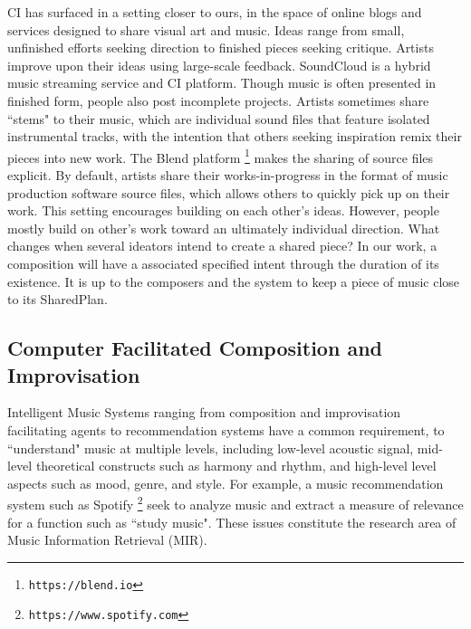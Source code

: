 \documentclass[final,authoryear,5p,times,twocolumn]{elsarticle}
\begin{document}
CI has surfaced in a setting closer to ours, in the space of online blogs and services designed to share visual art and music. Ideas range from small, unfinished efforts seeking direction to finished pieces seeking critique. Artists improve upon their ideas using large-scale feedback. SoundCloud is a hybrid music streaming service and CI platform. Though music is often presented in finished form, people also post incomplete projects. Artists sometimes share ``stems" to their music, which are individual sound files that feature isolated instrumental tracks, with the intention that others seeking inspiration remix their pieces into new work. The Blend platform \footnote{\texttt{https://blend.io}} makes the sharing of source files explicit. By default, artists share their works-in-progress in the format of music production software source files, which allows others to quickly pick up on their work. This setting encourages building on each other's ideas. However, people mostly build on other's work toward an ultimately individual direction. What changes when several ideators intend to create a shared piece? In our work, a composition will have a associated specified intent through the duration of its existence. It is up to the composers and the system to keep a piece of music close to its SharedPlan.

\subsection{Computer Facilitated Composition and Improvisation}

Intelligent Music Systems ranging from composition and improvisation facilitating agents to recommendation systems have a common requirement, to ``understand" music at multiple levels, including low-level acoustic signal, mid-level theoretical constructs such as harmony and rhythm, and high-level level aspects such as mood, genre, and style. For example, a music recommendation system such as Spotify \footnote{\texttt{https://www.spotify.com}} seek to analyze music and extract a measure of relevance for a function such as ``study music". These issues constitute the research area of Music Information Retrieval (MIR).
\end{document}
